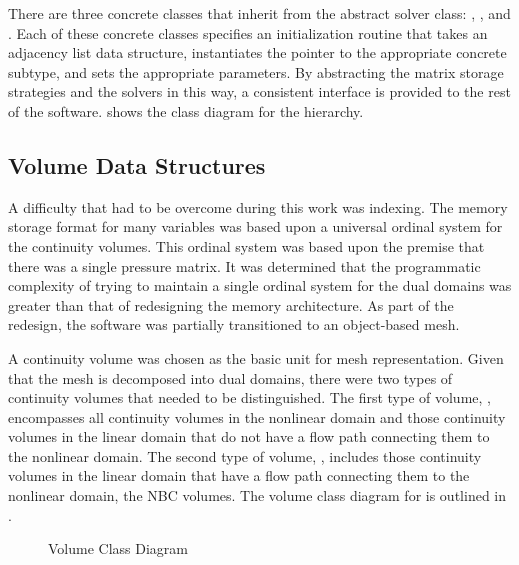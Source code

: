 There are three concrete classes that inherit from the abstract solver class: , , and .
Each of these concrete classes specifies an initialization routine that takes an adjacency list data structure, instantiates the  pointer to the appropriate concrete subtype, and sets the appropriate parameters.
By abstracting the matrix storage strategies and the solvers in this way, a consistent interface is provided to the rest of the software.
 shows the class diagram for the  hierarchy.

\subsection{Volume Data Structures}
\label{subsect:domDecompVolumeStructs}

A difficulty that had to be overcome during this work was indexing.
The memory storage format for many variables was based upon a universal ordinal system for the continuity volumes.
This ordinal system was based upon the premise that there was a single pressure matrix.
It was determined that the programmatic complexity of trying to maintain a single ordinal system for the dual domains was greater than that of redesigning the memory architecture.
As part of the redesign, the software was partially transitioned to an object-based mesh.

A continuity volume was chosen as the basic unit for mesh representation.
Given that the mesh is decomposed into dual domains, there were two types of continuity volumes that needed to be distinguished.
The first type of volume, , encompasses all continuity volumes in the nonlinear domain and those continuity volumes in the linear domain that do not have a flow path connecting them to the nonlinear domain.
The second type of volume, , includes those continuity volumes in the linear domain that have a flow path connecting them to the nonlinear domain, the NBC volumes.
The volume class diagram for \cobra{} is outlined in .

\begin{figure}[ht!]
\singlespace\centering

\caption{Volume Class Diagram}
\label{fig:volumeClassDiagram}
\end{figure}

